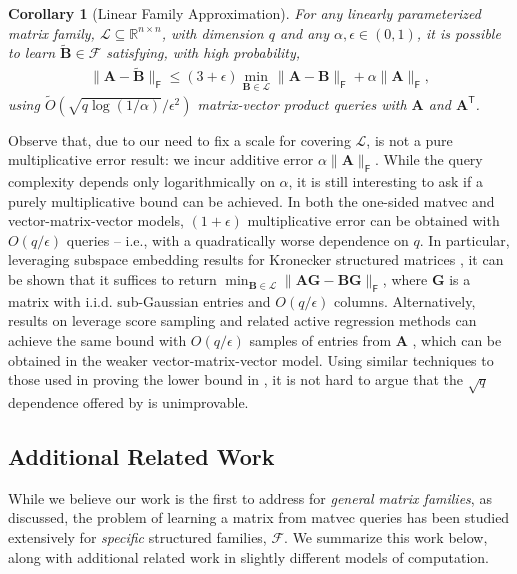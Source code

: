 \documentclass{article}[11pt]
\newtheorem{corollary}{Corollary}
\theoremstyle{definition}
\newcommand{\bv}[1]{\boldsymbol{\mathbf{#1}}}
\newcommand{\T}{\mathsf{T}}
\newcommand{\Fro}{\mathsf{F}}
\newcommand{\F}{\mathcal{F}}
\begin{document}
 \begin{corollary}[Linear Family Approximation]\label{cor:linear}
            For any linearly parameterized matrix family, $\mathcal{L} \subseteq \mathbb{R}^{n \times n}$, with dimension $q$ and any $\alpha,\epsilon \in (0,1)$, it is possible to learn $\bv{\tilde{B}} \in \mathcal{F}$ satisfying, with high probability,
            \begin{align*}
                \|\bv{A} - \bv{\tilde{B}}\|_\Fro \leq (3+\epsilon)\min_{\bv{B}\in \mathcal{L}}\|\bv{A} - \bv{B}\|_\Fro + \alpha\|\bv{A}\|_\Fro,
            \end{align*}
             using $\tilde O \left ({\sqrt{q \log(1/\alpha)}}/{\epsilon^2} \right )$ matrix-vector product queries with $\bv A$ and $\bv A^\T$.
\end{corollary}
Observe that, due to our need to fix a scale for covering $\mathcal{L}$,  is not a pure multiplicative error result: we incur additive error $\alpha\|\bv{A}\|_\Fro$. While the query complexity depends only logarithmically on $\alpha$, it is still interesting to ask if a purely multiplicative bound can be achieved. In both the one-sided matvec and vector-matrix-vector models, $(1+\epsilon)$ multiplicative error can be obtained with $O(q/\epsilon)$ queries -- i.e., with a quadratically worse dependence on $q$. In particular, leveraging subspace embedding results for Kronecker structured matrices \cite{AhleKapralovKnudsenPaghVelingkerWoodruff2020}, it can be shown that it suffices to return $\min_{\bv{B}\in \mathcal{L}}\|\bv{A}\bv{G} - \bv{B}\bv{G}\|_\Fro$, where $\bv{G}$ is a matrix with i.i.d. sub-Gaussian entries and $O(q/\epsilon)$ columns. Alternatively, results on leverage score sampling and related active regression methods can achieve the same bound with $O(q/\epsilon)$ samples of entries from $\bv{A}$ \cite{ChenPrice:2019a}, which can be obtained in the weaker vector-matrix-vector model. 
Using similar techniques to those used in proving the lower bound in , it is not hard to argue that the $\sqrt{q}$ dependence offered by  is unimprovable.

 
\subsection{Additional Related Work}
\label{sec:related_work}
While we believe our work is the first to address  for \emph{general matrix families}, as discussed, the problem of learning a matrix from matvec queries has been studied extensively for \emph{specific} structured families, $\F$. We summarize this work below, along with additional related work in slightly different models of computation. 
\end{document}
